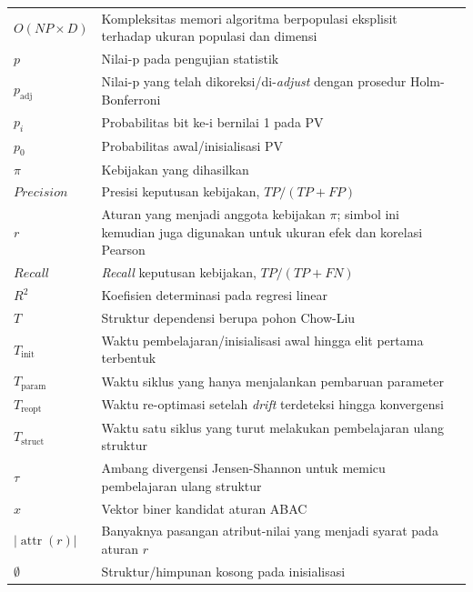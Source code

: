 \begin{longtable}{
    @{}
    >{\raggedright\arraybackslash}p{3cm}
    >{\raggedright\arraybackslash}p{7.5cm}
    >{\centering\arraybackslash}p{3.0cm}
    @{}
}
$O(NP \times D)$ & Kompleksitas memori algoritma berpopulasi eksplisit terhadap ukuran populasi dan dimensi & \pageref{first:symbol-onpd} \\
$p$ & Nilai-p pada pengujian statistik & \pageref{first:symbol-p} \\
$p_\text{adj}$ & Nilai-p yang telah dikoreksi/di-\textit{adjust} dengan prosedur Holm-Bonferroni & \pageref{first:symbol-padj} \\
$p_i$ & Probabilitas bit ke-i bernilai 1 pada PV & \pageref{first:symbol-pi} \\
$p_0$ & Probabilitas awal/inisialisasi PV & \pageref{first:symbol-p0} \\
$\pi$ & Kebijakan yang dihasilkan & \pageref{first:symbol-pi} \\
$Precision$ & Presisi keputusan kebijakan, $TP/(TP+FP)$ & \pageref{first:precision} \\
$r$ & Aturan yang menjadi anggota kebijakan $\pi$; simbol ini kemudian juga digunakan untuk ukuran efek dan korelasi Pearson & \pageref{first:symbol-r} \\
$Recall$ & \textit{Recall} keputusan kebijakan, $TP/(TP+FN)$ & \pageref{first:recall} \\
$R^2$ & Koefisien determinasi pada regresi linear & \pageref{first:symbol-r2} \\
$T$ & Struktur dependensi berupa pohon Chow-Liu & \pageref{first:tgede} \\
$T_\text{init}$ & Waktu pembelajaran/inisialisasi awal hingga elit pertama terbentuk & \pageref{first:tinit} \\
$T_\text{param}$ & Waktu siklus yang hanya menjalankan pembaruan parameter & \pageref{first:tparam} \\
$T_\text{reopt}$ & Waktu re-optimasi setelah \textit{drift} terdeteksi hingga konvergensi & \pageref{first:treopt} \\
$T_\text{struct}$ & Waktu satu siklus yang turut melakukan pembelajaran ulang struktur & \pageref{first:tstruct} \\
$\tau$ & Ambang divergensi Jensen-Shannon untuk memicu pembelajaran ulang struktur & \pageref{first:symbol-tau} \\
$x$ & Vektor biner kandidat aturan ABAC & \pageref{first:symbol-x} \\
$\lvert \operatorname{attr}(r) \rvert$ & Banyaknya pasangan atribut-nilai yang menjadi syarat pada aturan $r$ & \pageref{first:symbol-attrr} \\
$\emptyset$ & Struktur/himpunan kosong pada inisialisasi & \pageref{first:symbol-empty} \\

\end{longtable}

\endgroup